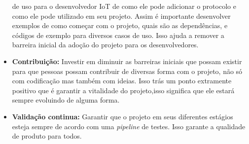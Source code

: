 \begin{itemize}
    de uso para o desenvolvedor IoT de como ele pode adicionar o protocolo e como ele pode
    utilizado em seu projeto. Assim é importante desenvolver exemplos de como começar
    com o projeto, quais são as dependências, e códigos de exemplo para diversos
    casos de uso. Isso ajuda a remover a barreira inicial da adoção do projeto para
    os desenvolvedores.
    \item \textbf{Contribuição:} Investir em diminuir as barreiras iniciais que possam
    existir para que pessoas possam contribuir de diversas forma com o projeto, não só
    com codificação mas também com ideias. Isso trás um ponto extramente positivo que é
    garantir a vitalidade do projeto,isso significa que ele estará sempre evoluindo de
    alguma forma.
    \item \textbf{Validação continua:} Garantir que o projeto em seus diferentes
    estágios esteja sempre de acordo com uma \textit{pipeline} de testes. Isso garante
    a qualidade de produto para todos.
\end{itemize}